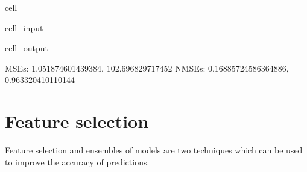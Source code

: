 \documentclass[letterpaper,10pt,english]{jupyterBook}
\begin{document}
\begin{sphinxuseclass}{cell}\begin{sphinxVerbatimInput}

\begin{sphinxuseclass}{cell_input}
\begin{sphinxVerbatim}[commandchars=\\\{\}]
\end{sphinxVerbatim}

\end{sphinxuseclass}\end{sphinxVerbatimInput}
\begin{sphinxVerbatimOutput}

\begin{sphinxuseclass}{cell_output}
\begin{sphinxVerbatim}[commandchars=\\\{\}]
MSEs: 1.051874601439384, 102.696829717452
NMSEs: 0.16885724586364886, 0.963320410110144
\end{sphinxVerbatim}

\end{sphinxuseclass}\end{sphinxVerbatimOutput}

\end{sphinxuseclass}

\section{Feature selection}
\label{\detokenize{05:feature-selection}}
\sphinxAtStartPar
Feature selection and ensembles of models are two techniques which can be used to improve the accuracy of predictions.
\end{document}
